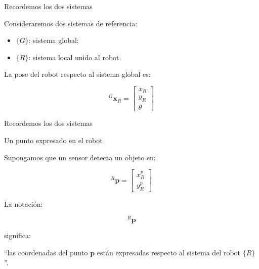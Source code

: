 \documentclass[aspectratio=169]{beamer}
\begin{document}
\begin{frame}{Recordemos los dos sistemas}

    Consideraremos dos sistemas de referencia:

    \begin{itemize}
        \item $\{G\}$: sistema global;
        \item $\{R\}$: sistema local unido al robot.
    \end{itemize}

    La pose del robot respecto al sistema global es:

    \[
    {}^{G}\mathbf{x}_R
    =
    \begin{bmatrix}
        x_R\\
        y_R\\
        \theta
    \end{bmatrix}
    \]

\end{frame}

\begin{frame}{Recordemos los dos sistemas}


    \vspace{0.3cm}


\end{frame}

\begin{frame}{Un punto expresado en el robot}

    Supongamos que un sensor detecta un objeto en:

    \[
    {}^{R}\mathbf{p}
    =
    \begin{bmatrix}
        x_R^{p}\\
        y_R^{p}
    \end{bmatrix}
    \]

    La notación:

    \[
    {}^{R}\mathbf{p}
    \]

    significa:

    \begin{center}
        ``las coordenadas del punto $\mathbf{p}$ están expresadas
        respecto al sistema del robot $\{R\}$''.
    \end{center}

\end{frame}
\end{document}
